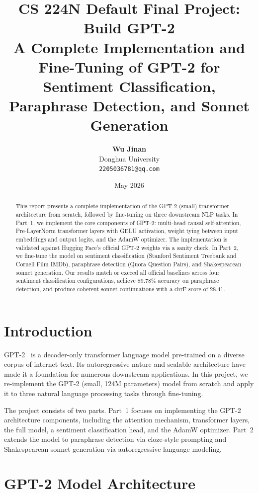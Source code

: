 \documentclass[11pt,a4paper]{article}
\title{\textbf{CS 224N Default Final Project: Build GPT-2}\\[6pt]
\large A Complete Implementation and Fine-Tuning of GPT-2 for\\Sentiment Classification, Paraphrase Detection, and Sonnet Generation}
\author{
  \textbf{Wu Jinan}\\\small Donghua University\\[4pt]
  \small\texttt{2205036781@qq.com}
}
\date{May 2026}
\begin{document}
\maketitle

\begin{abstract}
This report presents a complete implementation of the GPT-2 (small) transformer architecture from scratch, followed by fine-tuning on three downstream NLP tasks. In Part~1, we implement the core components of GPT-2: multi-head causal self-attention, Pre-LayerNorm transformer layers with GELU activation, weight tying between input embeddings and output logits, and the AdamW optimizer. The implementation is validated against Hugging Face's official GPT-2 weights via a sanity check. In Part~2, we fine-tune the model on sentiment classification (Stanford Sentiment Treebank and Cornell Film IMDb), paraphrase detection (Quora Question Pairs), and Shakespearean sonnet generation. Our results match or exceed all official baselines across four sentiment classification configurations, achieve 89.78\% accuracy on paraphrase detection, and produce coherent sonnet continuations with a chrF score of 28.41.
\end{abstract}

\section{Introduction}

GPT-2~\cite{radford2019language} is a decoder-only transformer language model pre-trained on a diverse corpus of internet text. Its autoregressive nature and scalable architecture have made it a foundation for numerous downstream applications. In this project, we re-implement the GPT-2 (small, 124M parameters) model from scratch and apply it to three natural language processing tasks through fine-tuning.

The project consists of two parts. Part~1 focuses on implementing the GPT-2 architecture components, including the attention mechanism, transformer layers, the full model, a sentiment classification head, and the AdamW optimizer. Part~2 extends the model to paraphrase detection via cloze-style prompting and Shakespearean sonnet generation via autoregressive language modeling.

\section{GPT-2 Model Architecture}
\end{document}
